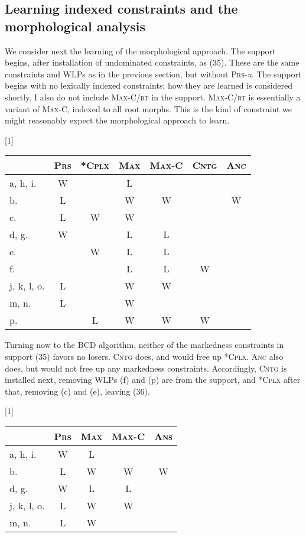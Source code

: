 \documentclass[output=paper,
modfonts
]{LSP/langsci}
\begin{document}
\subsection[Learning indexed constraints and the morphological analysis]{Learning indexed constraints and the morphological analysis}
\label{bkm:Ref335251071}
We consider next the learning of the morphological approach. The support begins, after installation of undominated constraints, as (35). These are the same constraints and WLPs as in the previous section, but without \textsc{Prs}{}-\textit{u}. The support begins with no lexically indexed constraints; how they are learned is considered shortly. I also do not include \textsc{Max-C/rt} in the support. \textsc{Max-C/rt} is essentially a variant of \textsc{Max-C,} indexed to all root morphs. This is the kind of constraint we might reasonably expect the morphological approach to learn.

\ea 
\renewcommand*\arraystretch{1.2}
\scalebox{1}[1]{\begin{tabular}[t]{|l||c|c||c|c|c|c|}
\firsthline & \textsc{Prs} & \textsc{*Cplx} & \textsc{Max} & \textsc{Max-C} &  \textsc{Cntg} &  \textsc{Anc} \\
\hline
\hline a, h, i. & W & & L & & & \\
\hline b. & L & & W & W & & W \\
\hline c. & L & W & W & & & \\
\hline d, g. & W & & L & L & & \\
\hline e. & & W & L & L & & \\
\hline f. & & & L & L & W & \\
\hline j, k, l, o. & L & & W & W & & \\
\hline m, n. & L & & W & & & \\
\hline p. & & L & W & W & W & \\
\hline \end{tabular}} \renewcommand*\arraystretch{1}
\z

Turning now to the BCD algorithm, neither of the markedness constraints in support (35) favors no losers. \textsc{Cntg} does, and would free up *\textsc{Cplx}. \textsc{Anc} also does, but would not free up any markedness constraints. Accordingly, \textsc{Cntg} is installed next, removing WLPs (f) and (p) are from the support, and *\textsc{Cplx} after that, removing (c) and (e), leaving (36).

\ea 
\renewcommand*\arraystretch{1.2}
\scalebox{1}[1]{\begin{tabular}[t]{|l||c||c|c|c|}
\firsthline & \textsc{Prs} & \textsc{Max} & \textsc{Max-C} & \textsc{Ans} \\
\hline
\hline a, h, i. & W & L & & \\
\hline b. & L & W & W & W \\
\hline d, g. & W &  L & L &  \\
\hline j, k, l, o. & L & W & W &  \\
\hline m, n. & L & W & & \\
\hline \end{tabular}} \renewcommand*\arraystretch{1}
\z
\end{document}
